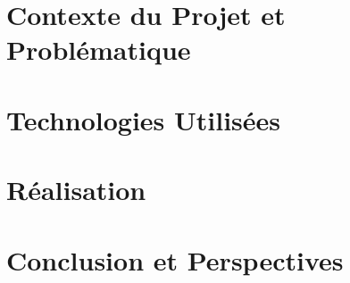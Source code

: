\documentclass[a4paper,11pt,oneside]{report}
\begin{document}
\newpage

\chapter{Contexte du Projet et Problématique}

\newpage

\chapter{Technologies Utilisées}

\newpage

\chapter{Réalisation}

\newpage

\chapter*{Conclusion et Perspectives}
\end{document}
